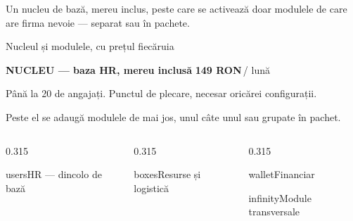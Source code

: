 \documentclass[aspectratio=169,11pt,t,xcolor={table}]{beamer}
\begin{document}
  {Un nucleu de bază, mereu inclus, peste care se activează doar modulele de care
   are firma nevoie — separat sau în pachete.}

\begin{frame}{Nucleul și modulele, cu prețul fiecăruia}
  \vspace{-2pt}
  \begin{tcolorbox}[enhanced,arc=3pt,colback=brandNavy,colframe=brandNavy,
      boxrule=0pt,left=9pt,right=9pt,top=5pt,bottom=5pt]
    {\footnotesize\color{white}\textbf{NUCLEU — baza HR, mereu inclusă}\hfill
     {\titlufont\bfseries\large\color{brandTeal}149 RON}\,\color{brandLine}/ lună}\par
    \vspace{2pt}
    {\scriptsize\color{brandLine} Până la 20 de angajați. Punctul de plecare, necesar
    oricărei configurații.}
  \end{tcolorbox}
  \vspace{6pt}
  {\scriptsize\color{brandSlate} Peste el se adaugă modulele de mai jos, unul câte
  unul sau grupate în pachet.}
  \vspace{5pt}
  \begin{columns}[T,onlytextwidth]
    \begin{column}{0.315\textwidth}
      \begin{cardm}[brandTeal]{users}{HR — dincolo de bază}
      \end{cardm}
    \end{column}
    \begin{column}{0.315\textwidth}
      \begin{cardm}[brandGreen]{boxes}{Resurse și logistică}
      \end{cardm}
    \end{column}
    \begin{column}{0.315\textwidth}
      \begin{cardm}[brandAmber]{wallet}{Financiar}
      \end{cardm}
      \vspace{4pt}
      \begin{cardm}[brandBlue]{infinity}{Module transversale}
      \end{cardm}
    \end{column}
  \end{columns}
\end{frame}
\end{document}
